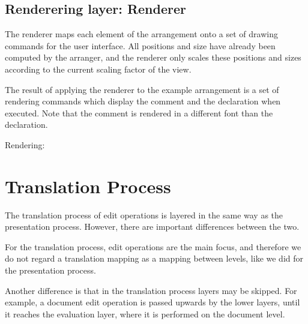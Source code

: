 %																
\subsection{Renderering layer: Renderer} \label{sect:renderer}

The renderer maps each element of the arrangement onto a set of drawing commands for the user interface. All positions and size have already been computed by the arranger, and the renderer only scales these positions and sizes according to the current scaling factor of the view.


 The result of applying the renderer to the example arrangement is a set of rendering commands which display the comment and the declaration when executed. Note that the comment is rendered in a different font than the declaration. 

Rendering:



%																
%																
%																
\section{Translation Process}

The translation process of edit operations is layered in the same way as the presentation process. However, there are important differences between the two.

For the translation process, edit operations are the main focus, and therefore we do not regard a translation mapping as a mapping between levels, like we did for the presentation process.

Another difference is that in the translation process layers may be skipped. For example, a document edit operation is passed upwards by the lower layers, until it reaches the evaluation layer, where it is performed on the document level.

